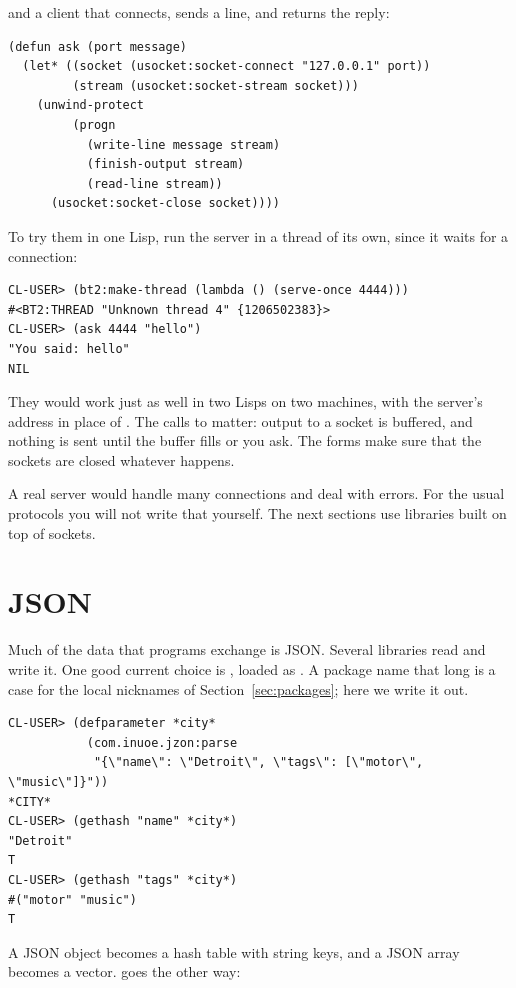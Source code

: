 \noindent
and a client that connects, sends a line, and returns the reply:

\begin{verbatim}
(defun ask (port message)
  (let* ((socket (usocket:socket-connect "127.0.0.1" port))
         (stream (usocket:socket-stream socket)))
    (unwind-protect
         (progn
           (write-line message stream)
           (finish-output stream)
           (read-line stream))
      (usocket:socket-close socket))))
\end{verbatim}

To try them in one Lisp, run the server in a thread of its own, since
it waits for a connection:

\begin{verbatim}
CL-USER> (bt2:make-thread (lambda () (serve-once 4444)))
#<BT2:THREAD "Unknown thread 4" {1206502383}>
CL-USER> (ask 4444 "hello")
"You said: hello"
NIL
\end{verbatim}

They would work just as well in two Lisps on two machines, with the
server's address in place of . The calls to
 matter: output to a socket is buffered, and
nothing is sent until the buffer fills or you ask. The
 forms make sure that the sockets are closed
whatever happens.

A real server would handle many connections and deal with errors.
For the usual protocols you will not write that yourself. The next
sections use libraries built on top of sockets.

\section{JSON}

Much of the data that programs exchange is JSON. Several libraries
read and write it. One good current choice is , loaded
as . A package name that long is a case for the
local nicknames of Section~\ref{sec:packages}; here we write it out.

\begin{verbatim}
CL-USER> (defparameter *city*
           (com.inuoe.jzon:parse
            "{\"name\": \"Detroit\", \"tags\": [\"motor\", \"music\"]}"))
*CITY*
CL-USER> (gethash "name" *city*)
"Detroit"
T
CL-USER> (gethash "tags" *city*)
#("motor" "music")
T
\end{verbatim}

A JSON object becomes a hash table with string keys, and a JSON array
becomes a vector.  goes the other way:

